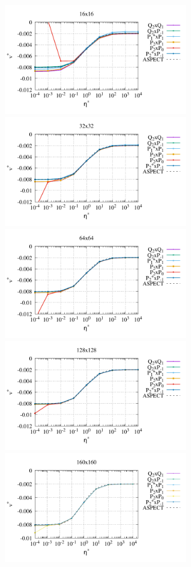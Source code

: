 \begin{center}
\includegraphics[width=8cm]{python_codes/fieldstone_120/paperresults/sinker_reduced/structured/sinker_reduced_vel_16}
\includegraphics[width=8cm]{python_codes/fieldstone_120/paperresults/sinker_reduced/structured/sinker_reduced_vel_32}\\
\includegraphics[width=8cm]{python_codes/fieldstone_120/paperresults/sinker_reduced/structured/sinker_reduced_vel_64}
\includegraphics[width=8cm]{python_codes/fieldstone_120/paperresults/sinker_reduced/structured/sinker_reduced_vel_128}\\
\includegraphics[width=8cm]{python_codes/fieldstone_120/paperresults/sinker_reduced/structured/sinker_reduced_vel_160}\\

\end{center}
